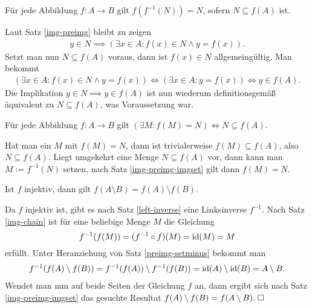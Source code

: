 \begin{Satz}\label{img-preimg-imgset}
Für jede Abbildung $f\colon A\to B$ gilt $f(f^{-1}(N))=N$,
sofern $N\subseteq f(A)$ ist.
\end{Satz}
\begin{Beweis}
Laut Satz \ref{img-preimg} bleibt zu zeigen
\begin{gather*}
y\in N\implies (\exists x\in A\colon f(x)\in N\land y=f(x)).
\end{gather*}
Setzt man nun $N\subseteq f(A)$ voraus, dann ist $f(x)\in N$
allgemeingültig. Man bekommt
\begin{gather*}
(\exists x\in A\colon f(x)\in N\land y=f(x))
\iff (\exists x\in A\colon y=f(x))\iff y\in f(A).
\end{gather*}
Die Implikation $y\in N\implies y\in f(A)$ ist nun
wiederum definitionsgemäß äquivalent zu $N\subseteq f(A)$,
was Voraussetzung war.\;\qedsymbol
\end{Beweis}

\begin{Satz}
Für jede Abbildung $f\colon A\to B$ gilt
$(\exists M\colon f(M)=N)\iff N\subseteq f(A)$.
\end{Satz}
\begin{Beweis}
Hat man ein $M$ mit $f(M)=N$, dann ist trivialerweise
$f(M)\subseteq f(A)$, also $N\subseteq f(A)$. Liegt umgekehrt
eine Menge $N\subseteq f(A)$ vor, dann kann man $M:=f^{-1}(N)$
setzen, nach Satz \ref{img-preimg-imgset} gilt dann $f(M)=N$.\;\qedsymbol
\end{Beweis}

\begin{Satz}\label{inj-img-setminus}
Ist $f$ injektiv, dann gilt $f(A\setminus B)=f(A)\setminus f(B)$.
\end{Satz}
\begin{Beweis}
Da $f$ injektiv ist, gibt es nach Satz \ref{left-inverse} eine
Linksinverse $f^{-1}$. Nach Satz \ref{img-chain} ist für eine
beliebige Menge $M$ die Gleichung
\[f^{-1}(f(M)) = (f^{-1}\circ f)(M) = \operatorname{id}(M) = M\]
erfüllt. Unter Heranziehung von Satz \ref{preimg-setminus}
bekommt man
\begin{gather*}
f^{-1}(f(A)\setminus f(B)) = f^{-1}(f(A))\setminus f^{-1}(f(B))
= \operatorname{id}(A)\setminus\operatorname{id}(B) = A\setminus B.
\end{gather*}
Wendet man nun auf beide Seiten der Gleichung $f$ an, dann ergibt
sich nach Satz \ref{img-preimg-imgset} das gesuchte Resultat
$f(A)\setminus f(B) = f(A\setminus B).\;\square$
\end{Beweis}

